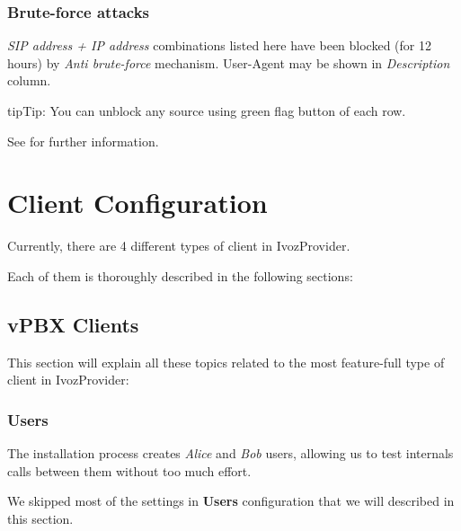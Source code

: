 \documentclass[letterpaper,10pt,english]{sphinxmanual}
\begin{document}
\subsection{Brute-force attacks}
\label{administration_portal/brand/views/bruteforce_attacks::doc}\label{administration_portal/brand/views/bruteforce_attacks:brute-force-attacks}
\emph{SIP address + IP address} combinations listed here have been blocked (for 12 hours) by \emph{Anti brute-force} mechanism.
User-Agent may be shown in \emph{Description} column.

\begin{notice}{tip}{Tip:}
You can unblock any source using green flag button of each row.
\end{notice}

See {\hyperref[security_and_maintenance/security/antibruteforce:anti\string-brute\string-force\string-attacks]{}} for further information.


\chapter{Client Configuration}
\label{administration_portal/client/index:client-configuration}\label{administration_portal/client/index::doc}
Currently, there are 4 different types of client in IvozProvider.

Each of them is thoroughly described in the following sections:


\section{vPBX Clients}
\label{administration_portal/client/vpbx/index:vpbx-clients}\label{administration_portal/client/vpbx/index::doc}
This section will explain all these topics related to the most feature-full type of client in IvozProvider:


\subsection{Users}
\label{administration_portal/client/vpbx/users::doc}\label{administration_portal/client/vpbx/users:users}\label{administration_portal/client/vpbx/users:id1}
The installation process creates \emph{Alice} and \emph{Bob} users, allowing us
to test internals calls between them without too much effort.

We skipped most of the settings in \textbf{Users} configuration that we will described
in this section.
\end{document}
